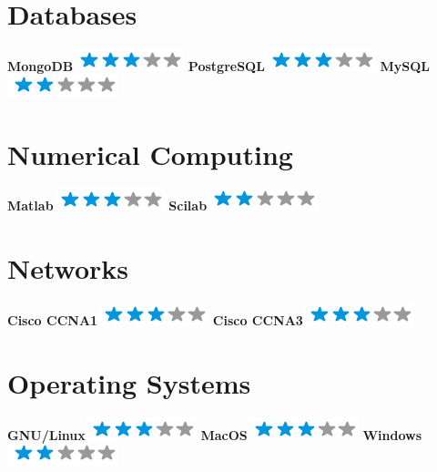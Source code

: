 \documentclass[]{friggeri-cv}
\begin{document}
\begin{aside}
  \section{Databases}
    \textbf{MongoDB}\includegraphics[scale=0.40]{img/3stars.png}
    \textbf{PostgreSQL}\includegraphics[scale=0.40]{img/3stars.png}
    \textbf{MySQL}\includegraphics[scale=0.40]{img/2stars.png}
  \section{Numerical Computing}
    \textbf{Matlab}\includegraphics[scale=0.40]{img/3stars.png}
    \textbf{Scilab}\includegraphics[scale=0.40]{img/2stars.png}
  \section{Networks}
    \textbf{Cisco CCNA1}\includegraphics[scale=0.40]{img/3stars.png}
    \textbf{Cisco CCNA3}\includegraphics[scale=0.40]{img/3stars.png}
  \section{Operating Systems}
    \textbf{GNU/Linux}\includegraphics[scale=0.40]{img/3stars.png}
    \textbf{MacOS}\includegraphics[scale=0.40]{img/3stars.png}
    \textbf{Windows}\includegraphics[scale=0.40]{img/2stars.png}
\end{aside}
\end{document}
